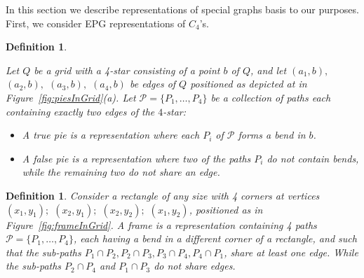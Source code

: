 \documentclass[preprint,12pt]{elsarticle} %
\newtheorem{defi}[theorem]{Definition}
\begin{document}

% 

In this section we describe representations of special graphs basis to our purposes. First, we consider EPG representations of $C_4$'s.


\begin{defi} \label{defi:tortasFrame}

Let $ Q $ be a grid with a 4-star consisting of a point $b$ of $Q$,  and let $ (a_1, b),$ $(a_2, b),$ $(a_3, b),$ $(a_4, b)$ be edges of $ Q$ positioned as depicted at in Figure~\ref{fig:piesInGrid}(a). Let $ \mathcal{P} = \{P_1, \dots , P_4\}$ be a collection of paths each containing exactly two edges of the $4$-star:

\begin{itemize}
\item A \emph{true pie} is a representation where each $P_i$ of $ \mathcal{P} $ forms a bend in $b$.

\item A \emph {false pie} is a representation where two of the paths $P_i$ do not contain bends, while the remaining two do not share an edge. 




\end{itemize}
\end{defi}

\begin{defi} \label{defi:tortasFrame2}
 Consider a rectangle of any size with 4 corners at vertices $ (x_1, y_1);$ $(x_2, y_1);$ $(x_2, y_2);$ $(x_1, y_2) $, positioned as in  Figure~\ref{fig:frameInGrid}. A \emph{frame} is a representation containing 4 paths $\mathcal{P} =  \{ P_1, \dots, P_4\} $, each having a bend in a different corner of a rectangle, and such that the  sub-paths $ P_1 \cap P_2, P_2 \cap P_3, P_3 \cap P_4, P_4 \cap P_1 $, share at least one edge. While the sub-paths $ P_2 \cap P_4 $ and $ P_1 \cap P_3 $ do not share edges.



\end{defi}
\end{document}

